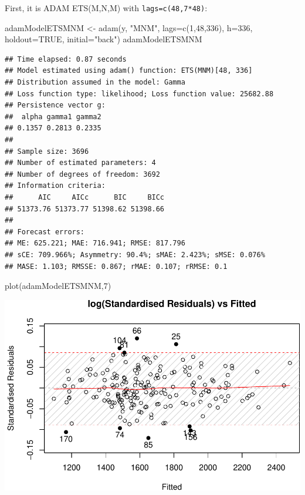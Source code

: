 \documentclass[
]{book}
\newenvironment{Shaded}{\begin{snugshade}}{\end{snugshade}}
\newcommand{\AttributeTok}[1]{\textcolor[rgb]{0.77,0.63,0.00}{#1}}
\newcommand{\ConstantTok}[1]{\textcolor[rgb]{0.00,0.00,0.00}{#1}}
\newcommand{\DecValTok}[1]{\textcolor[rgb]{0.00,0.00,0.81}{#1}}
\newcommand{\FunctionTok}[1]{\textcolor[rgb]{0.00,0.00,0.00}{#1}}
\newcommand{\NormalTok}[1]{#1}
\newcommand{\OtherTok}[1]{\textcolor[rgb]{0.56,0.35,0.01}{#1}}
\newcommand{\StringTok}[1]{\textcolor[rgb]{0.31,0.60,0.02}{#1}}
\theoremstyle{definition}
\theoremstyle{definition}
\theoremstyle{definition}
\theoremstyle{definition}
\theoremstyle{remark}
\begin{document}
First, it is ADAM ETS(M,N,M) with \texttt{lags=c(48,7*48)}:

\begin{Shaded}
\begin{Highlighting}[]
\NormalTok{adamModelETSMNM }\OtherTok{\textless{}{-}} \FunctionTok{adam}\NormalTok{(y, }\StringTok{"MNM"}\NormalTok{, }\AttributeTok{lags=}\FunctionTok{c}\NormalTok{(}\DecValTok{1}\NormalTok{,}\DecValTok{48}\NormalTok{,}\DecValTok{336}\NormalTok{),}
                        \AttributeTok{h=}\DecValTok{336}\NormalTok{, }\AttributeTok{holdout=}\ConstantTok{TRUE}\NormalTok{,}
                        \AttributeTok{initial=}\StringTok{"back"}\NormalTok{)}
\NormalTok{adamModelETSMNM}
\end{Highlighting}
\end{Shaded}

\begin{verbatim}
## Time elapsed: 0.87 seconds
## Model estimated using adam() function: ETS(MNM)[48, 336]
## Distribution assumed in the model: Gamma
## Loss function type: likelihood; Loss function value: 25682.88
## Persistence vector g:
##  alpha gamma1 gamma2 
## 0.1357 0.2813 0.2335 
## 
## Sample size: 3696
## Number of estimated parameters: 4
## Number of degrees of freedom: 3692
## Information criteria:
##      AIC     AICc      BIC     BICc 
## 51373.76 51373.77 51398.62 51398.66 
## 
## Forecast errors:
## ME: 625.221; MAE: 716.941; RMSE: 817.796
## sCE: 709.966%; Asymmetry: 90.4%; sMAE: 2.423%; sMSE: 0.076%
## MASE: 1.103; RMSSE: 0.867; rMAE: 0.107; rRMSE: 0.1
\end{verbatim}

\begin{Shaded}
\begin{Highlighting}[]
\FunctionTok{plot}\NormalTok{(adamModelETSMNM,}\DecValTok{7}\NormalTok{)}
\end{Highlighting}
\end{Shaded}

\includegraphics{adam_files/figure-latex/unnamed-chunk-104-1.pdf}
\end{document}
